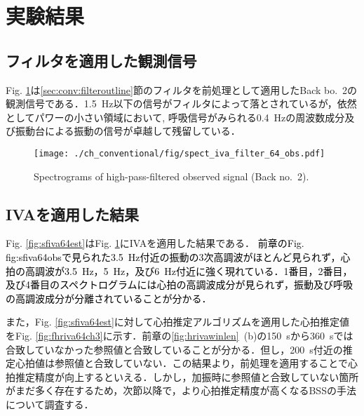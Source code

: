 \section{実験結果}
\label{sec:conv:expresult5}

\subsection{フィルタを適用した観測信号}
\label{sec:conv:resultiva}
Fig. \ref{fig:sfiva64obs}は\ref{sec:conv:filteroutline}節のフィルタを前処理として適用したBack bo.~2の観測信号である．1.5~Hz以下の信号がフィルタによって落とされているが，依然としてパワーの小さい領域において, 呼吸信号がみられる0.4~Hzの周波数成分及び振動台による振動の信号が卓越して残留している．

\begin{figure}[tb]
\centering
\texttt{[image: ./ch\_conventional/fig/spect\_iva\_filter\_64\_obs.pdf]}
\caption{Spectrograms of high-pass-filtered observed signal (Back no.~2).}
\label{fig:sfiva64obs}
\end{figure}

\subsection{IVAを適用した結果}
\label{sec:conv:resultiva}
Fig. \ref{fig:sfiva64est}はFig. \ref{fig:sfiva64obs}にIVAを適用した結果である．
\textcolor{black}{前章のFig. {fig:sfiva64obs}で見られた3.5~Hz付近の振動の3次高調波がほとんど見られず，心拍の高調波が3.5~Hz，5~Hz，及び6~Hz付近に強く現れている．1番目，2番目，及び4番目のスペクトログラムには心拍の高調波成分が見られず，振動及び呼吸の高調波成分が分離されていることが分かる．}

また，Fig. \ref{fig:sfiva64est}に対して心拍推定アルゴリズムを適用した心拍推定値をFig. \ref{fig:fhriva64ch3}に示す．前章の\ref{fig:hrivawinlen}~(b)の150~sから360~sでは合致していなかった参照値と合致していることが分かる．但し，200~s付近の推定心拍値は参照値と合致していない．この結果より，前処理を適用することで心拍推定精度が向上するといえる．しかし，加振時に参照値と合致していない箇所がまだ多く存在するため，次節以降で，より心拍推定精度が高くなるBSSの手法について調査する．

